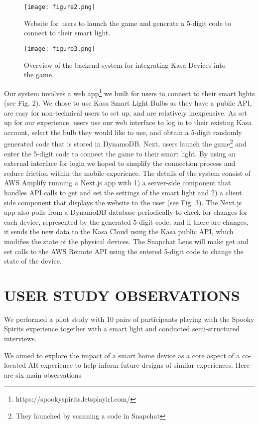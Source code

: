 \documentclass[sigconf, language=french,
language=german, language=spanish, language=english]{acmart}
\begin{document}
\begin{figure}[h!] \texttt{[image: figure2.png]}
  \caption{Website for users to launch the game and generate
a 5-digit code to connect to their smart light.}
  \label{fig2}
\end{figure}

\begin{figure}[h!] \texttt{[image: figure3.png]}
  \caption{Overview of the backend system for integrating
Kasa Devices into the game.}
  \label{fig3}
\end{figure}

Our system involves a web app\footnote{https://spookyspirits.letsplayirl.com/} we built for users to connect to
their smart lights (see Fig. 2). We chose to use Kasa Smart Light
Bulbs as they have a public API, are easy for non-technical users to
set up, and are relatively inexpensive. As set up for our experience,
users use our web interface to log in to their existing Kasa account,
select the bulb they would like to use, and obtain a 5-digit randomly
generated code that is stored in DynamoDB. Next, users launch
the game\footnote{They launched by scanning a code in Snapchat}
and enter the 5-digit code to connect the game to their
smart light. By using an external interface for login we hoped
to simplify the connection process and reduce friction within the
mobile experience. The details of the system consist of AWS Amplify
running a Next.js app with 1) a server-side component that handles
API calls to get and set the settings of the smart light and 2) a client side component that displays the website to the user (see Fig. 3).
The Next.js app also polls from a DynamoDB database periodically
to check for changes for each device, represented by the generated
5-digit code, and if there are changes, it sends the new data to the
Kasa Cloud using the Kasa public API, which modifies the state of
the physical devices. The Snapchat Lens will make get and set calls
to the AWS Remote API using the entered 5-digit code to change
the state of the device.

\section{USER STUDY OBSERVATIONS}

We performed a pilot study with 10 pairs of participants playing
with the Spooky Spirits experience together with a smart light and
conducted semi-structured interviews.


We aimed to explore the impact of a smart home device as a core
aspect of a co-located AR experience to help inform future designs
of similar experiences. Here are six main observations
\end{document}
